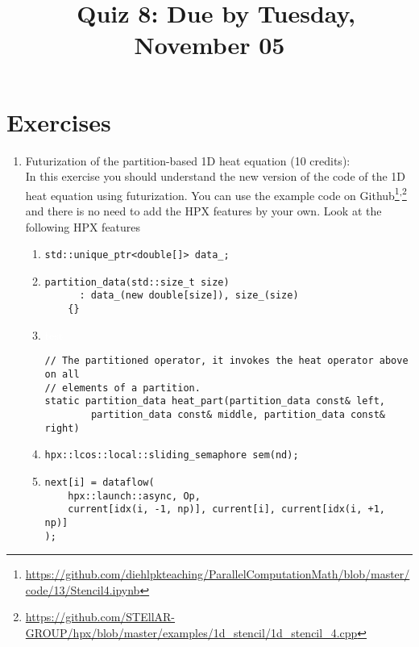 \documentclass[11pt]{article}
\begin{document}
\title{\coursename~Quiz 8: Due by Tuesday, November 05}
\date{}
\maketitle

\medskip


\section*{Exercises}

\begin{enumerate}
\item Futurization of the partition-based 1D heat equation (10 credits): \\
In this exercise you should understand the new version of the code of the 1D heat equation using futurization. You can use the example code on Github\footnote{\url{https://github.com/diehlpkteaching/ParallelComputationMath/blob/master/code/13/Stencil4.ipynb}}\textsuperscript{,}\footnote{\url{https://github.com/STEllAR-GROUP/hpx/blob/master/examples/1d_stencil/1d_stencil_4.cpp}} and there is no need to add the HPX features by your own. Look at the following HPX features
\begin{enumerate}
\item \lstinline|std::unique_ptr<double[]> data_;|
\item \begin{lstlisting}
partition_data(std::size_t size)
      : data_(new double[size]), size_(size)
    {}
\end{lstlisting} 
\item \textcolor{white}{test}

\begin{lstlisting}
// The partitioned operator, it invokes the heat operator above on all
// elements of a partition.
static partition_data heat_part(partition_data const& left,
        partition_data const& middle, partition_data const& right)
\end{lstlisting}

\item \lstinline|hpx::lcos::local::sliding_semaphore sem(nd);|

\item \begin{lstlisting}
next[i] = dataflow(
    hpx::launch::async, Op,
    current[idx(i, -1, np)], current[i], current[idx(i, +1, np)]
);
\end{lstlisting}


\end{enumerate}
\end{enumerate}
\end{document}
